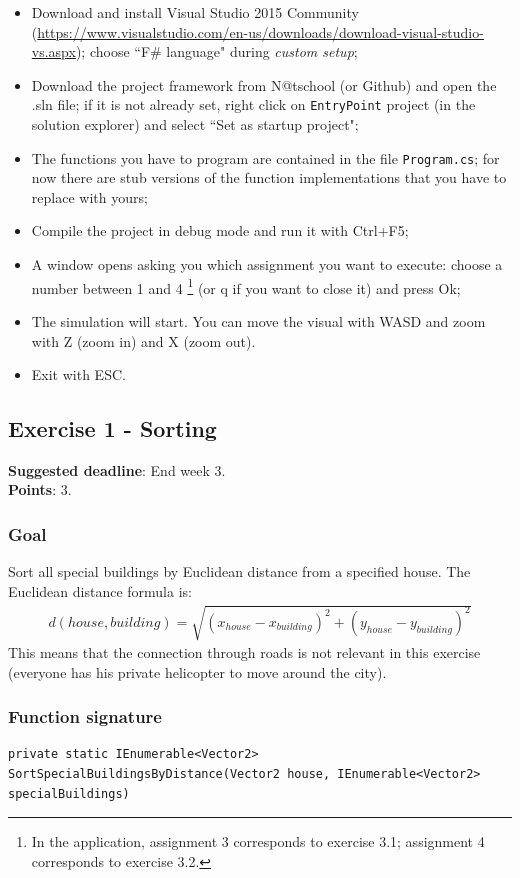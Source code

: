\begin{itemize}
\item Download and install Visual Studio 2015 Community (\url{https://www.visualstudio.com/en-us/downloads/download-visual-studio-vs.aspx}); choose ``F\# language" during \textit{custom setup}; 
\item Download the project framework from N@tschool (or Github) and open the .sln file; if it is not already set, right click on \texttt{EntryPoint} project (in the solution explorer) and select ``Set as startup project";
\item The functions you have to program are contained in the file \texttt{Program.cs}; for now there are stub versions of the function implementations that you have to replace with yours;
\item Compile the project in debug mode and run it with Ctrl+F5;
\item A window opens asking you which assignment you want to execute: choose a number between 1 and 4 \footnote{In the application, assignment 3 corresponds to exercise 3.1; assignment 4 corresponds to exercise 3.2.} (or q if you want to close it) and press Ok;
\item The simulation will start. You can move the visual with WASD and zoom with Z (zoom in) and X (zoom out).
\item Exit with ESC. 
\end{itemize}

\newpage
\subsection*{Exercise 1 - Sorting}

\textbf{Suggested deadline}: End week 3. \\
\textbf{Points}: 3.

\subsubsection*{Goal}
Sort all special buildings by Euclidean distance from a specified house. The Euclidean distance formula is:
\begin{align*}
d(house,building) = \sqrt{(x_{house} - x_{building})^{2} + (y_{house} - y_{building})^{2} } 
\end{align*}
This means that the connection through roads is not relevant in this exercise (everyone has his private helicopter to move around the city).

\subsubsection*{Function signature} 
\begin{lstlisting}
private static IEnumerable<Vector2> SortSpecialBuildingsByDistance(Vector2 house, IEnumerable<Vector2> specialBuildings)
\end{lstlisting}

